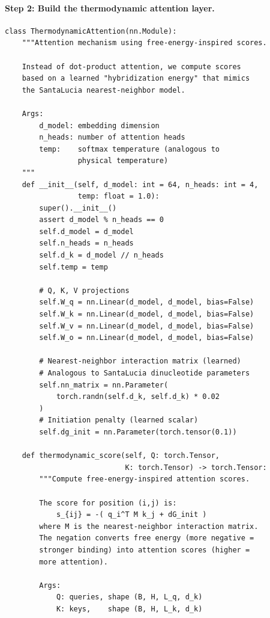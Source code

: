\paragraph{Step 2: Build the thermodynamic attention layer.}

\begin{lstlisting}[style=dogmapython, caption={Lab 5: Thermodynamic attention mechanism.}]
class ThermodynamicAttention(nn.Module):
    """Attention mechanism using free-energy-inspired scores.

    Instead of dot-product attention, we compute scores
    based on a learned "hybridization energy" that mimics
    the SantaLucia nearest-neighbor model.

    Args:
        d_model: embedding dimension
        n_heads: number of attention heads
        temp:    softmax temperature (analogous to
                 physical temperature)
    """
    def __init__(self, d_model: int = 64, n_heads: int = 4,
                 temp: float = 1.0):
        super().__init__()
        assert d_model % n_heads == 0
        self.d_model = d_model
        self.n_heads = n_heads
        self.d_k = d_model // n_heads
        self.temp = temp

        # Q, K, V projections
        self.W_q = nn.Linear(d_model, d_model, bias=False)
        self.W_k = nn.Linear(d_model, d_model, bias=False)
        self.W_v = nn.Linear(d_model, d_model, bias=False)
        self.W_o = nn.Linear(d_model, d_model, bias=False)

        # Nearest-neighbor interaction matrix (learned)
        # Analogous to SantaLucia dinucleotide parameters
        self.nn_matrix = nn.Parameter(
            torch.randn(self.d_k, self.d_k) * 0.02
        )
        # Initiation penalty (learned scalar)
        self.dg_init = nn.Parameter(torch.tensor(0.1))

    def thermodynamic_score(self, Q: torch.Tensor,
                            K: torch.Tensor) -> torch.Tensor:
        """Compute free-energy-inspired attention scores.

        The score for position (i,j) is:
            s_{ij} = -( q_i^T M k_j + dG_init )
        where M is the nearest-neighbor interaction matrix.
        The negation converts free energy (more negative =
        stronger binding) into attention scores (higher =
        more attention).

        Args:
            Q: queries, shape (B, H, L_q, d_k)
            K: keys,    shape (B, H, L_k, d_k)


\end{lstlisting}
